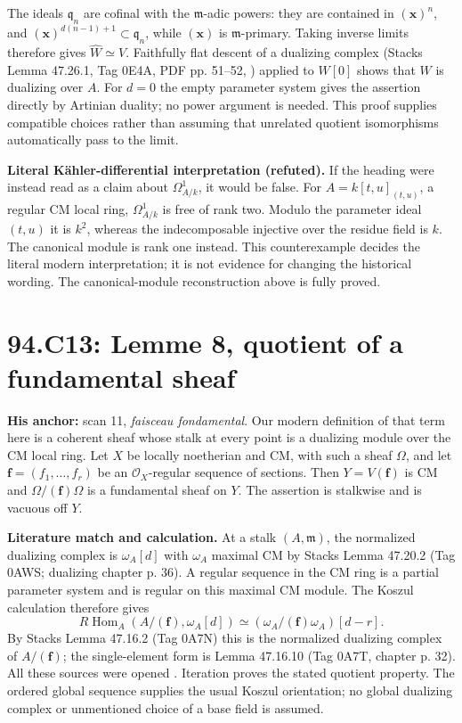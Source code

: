\documentclass[11pt]{article}
\newcommand{\Hom}{\operatorname{Hom}}
\newcommand{\m}{\mathfrak m}
\begin{document}
The ideals $\mathfrak q_n$ are cofinal with the $\m$-adic powers:
they are contained in $(\mathbf x)^n$, and
$(\mathbf x)^{d(n-1)+1}\subset\mathfrak q_n$, while $(\mathbf x)$
is $\m$-primary. Taking inverse limits therefore gives
$\widehat W\simeq V$. Faithfully flat descent of a dualizing complex
(Stacks Lemma 47.26.1, Tag 0E4A, PDF pp. 51--52,
\cite{StacksDualizingDescent}) applied to $W[0]$ shows that $W$ is
dualizing over $A$. For $d=0$ the empty parameter system gives the
assertion directly by Artinian duality; no power argument is needed.
This proof supplies compatible choices rather than assuming that
unrelated quotient isomorphisms automatically pass to the limit.

\textbf{Literal K\"ahler-differential interpretation (refuted).}
If the heading were instead read as a claim about $\Omega^1_{A/k}$,
it would be false. For $A=k[t,u]_{(t,u)}$, a regular CM local ring,
$\Omega^1_{A/k}$ is free of rank two. Modulo the parameter ideal
$(t,u)$ it is $k^2$, whereas the indecomposable injective over the
residue field is $k$. The canonical module is rank one instead.
This counterexample decides the literal modern interpretation;
it is not evidence for changing the historical wording. The
canonical-module reconstruction above is fully proved.

\section{94.C13: Lemme 8, quotient of a fundamental sheaf}
\label{C13}
\textbf{His anchor:} scan 11, \emph{faisceau fondamental}.
Our modern definition of that term here is a coherent sheaf whose
stalk at every point is a dualizing module over the CM local ring.
Let $X$ be locally noetherian and CM, with such a sheaf $\Omega$,
and let $\mathbf f=(f_1,\ldots,f_r)$ be an
$\mathcal O_X$-regular sequence of sections. Then
$Y=V(\mathbf f)$ is CM and $\Omega/(\mathbf f)\Omega$ is a
fundamental sheaf on $Y$. The assertion is stalkwise and is vacuous
off $Y$.

\textbf{Literature match and calculation.}
At a stalk $(A,\m)$, the normalized dualizing complex is
$\omega_A[d]$ with $\omega_A$ maximal CM by Stacks Lemma 47.20.2
(Tag 0AWS; dualizing chapter p. 36). A regular sequence in the
CM ring is a partial parameter system and is regular on this
maximal CM module. The Koszul calculation therefore gives
\[
 R\Hom_A(A/(\mathbf f),\omega_A[d])
 \simeq (\omega_A/(\mathbf f)\omega_A)[d-r].
\]
By Stacks Lemma 47.16.2 (Tag 0A7N) this is the normalized dualizing
complex of $A/(\mathbf f)$; the single-element form is Lemma
47.16.10 (Tag 0A7T, chapter p. 32). All these sources were opened
\cite{StacksDualizingLocal,StacksDualizingCM}.
Iteration proves the stated quotient property. The ordered global
sequence supplies the usual Koszul orientation; no global dualizing
complex or unmentioned choice of a base field is assumed.
\end{document}
